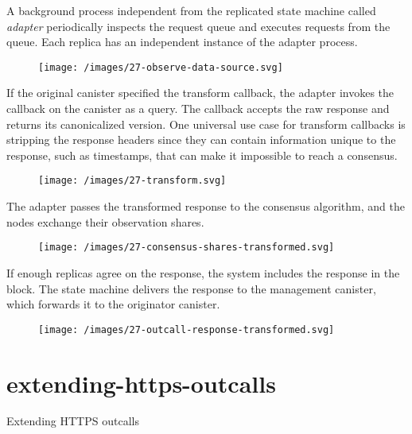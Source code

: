 \documentclass{article}
\begin{document}
A background process independent from the replicated state machine called \emph{adapter} periodically inspects the request queue and executes requests from the queue.
Each replica has an independent instance of the adapter process.

\begin{figure}[grayscale-diagram,p75]
\texttt{[image: /images/27-observe-data-source.svg]}
\end{figure}

If the original canister specified the transform callback, the adapter invokes the callback on the canister as a query.
The callback accepts the raw  response and returns its canonicalized version.
One universal use case for transform callbacks is stripping the response headers since they can contain information unique to the response, such as timestamps, that can make it impossible to reach a consensus.

\begin{figure}[grayscale-diagram,p75]
\texttt{[image: /images/27-transform.svg]}
\end{figure}

The adapter passes the transformed response to the consensus algorithm, and the nodes exchange their observation shares.

\begin{figure}[grayscale-diagram,p75]
\label{fig-consensus-shares-transformed}
\texttt{[image: /images/27-consensus-shares-transformed.svg]}
\end{figure}

If enough replicas agree on the response, the system includes the response in the block.
The state machine delivers the response to the management canister, which forwards it to the originator canister.

\begin{figure}[grayscale-diagram,p75]
\texttt{[image: /images/27-outcall-response-transformed.svg]}
\end{figure}

\section{extending-https-outcalls}{Extending HTTPS outcalls}
\end{document}
